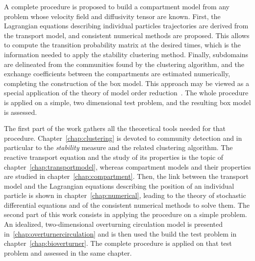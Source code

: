 A complete procedure is proposed to build a compartment model from any problem whose velocity field and diffusivity tensor are known. First, the Lagrangian equations describing individual particles trajectories are derived from the transport model, and consistent numerical methods are proposed. This allows to compute the transition probability matrix at the desired times, which is the information needed to apply the stability clustering method. Finally, subdomains are delineated from the communities found by the clustering algorithm, and the exchange coefficients between the compartments are estimated numerically, completing the construction of the box model. This approach may be viewed	as a special application of the theory of model order reduction~\cite{deleersnijder2009reduction}. The whole procedure is applied on a simple, two dimensional test problem, and the resulting box model is assessed.  

The first part of the work gathers all the theoretical tools needed for that procedure. Chapter~\ref{chap:clustering} is devoted to community detection and in particular to the \textit{stability} measure and the related clustering algorithm. The reactive transport equation and the study of its properties is the topic of chapter~\ref{chap:transportmodel}, whereas compartment models and their properties are studied in chapter~\ref{chap:compartment}. Then, the link between the transport model and the Lagrangian equations describing the position of an individual particle is shown in chapter~\ref{chap:numerical}, leading to the theory of stochastic differential equations and of the consistent numerical methods to solve them. The second part of this work consists in applying the procedure on a simple problem. An idealized, two-dimensional overturning circulation model is presented in~\ref{chap:overturnercirculation} and is then used the build the test problem in chapter~\ref{chap:bioverturner}. The complete procedure is applied on that test problem and assessed in the same chapter. 


